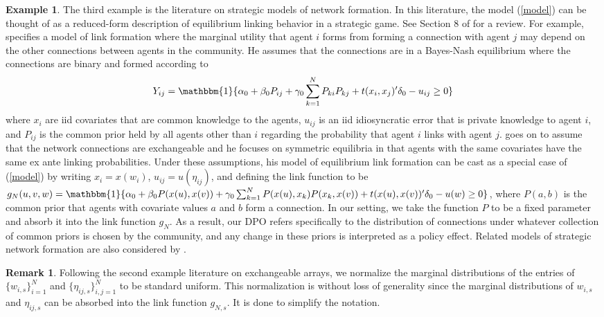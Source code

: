 \documentclass[12pt]{article}
\theoremstyle{definition}
\newtheorem{example}{Example}
\newtheorem{remark}{Remark}
\begin{document}
\begin{example}
The third example is the literature on strategic models of network formation. In this literature, the model (\ref{model}) can be thought of as a reduced-form description of equilibrium linking behavior in a strategic game. See Section 8 of \cite{graham2020network} for a review.  For example, \cite{leung2015two} specifies a model of link formation where the marginal utility that agent $i$ forms from forming a connection with agent $j$ may depend on the other connections between agents in the community. He assumes that the connections are in a Bayes-Nash equilibrium where the connections are binary and formed according to 
\begin{equation*}
Y_{ij} = \mathbbm{1}\{\alpha_0 + \beta_0 P_{ij} + \gamma_0 \sum_{k=1}^{N} P_{ki}P_{kj} + t(x_i,x_j)'\delta_0 - u_{ij} \geq 0\}
\end{equation*}
where $x_i$ are iid covariates that are common knowledge to the agents, $u_{ij}$ is an iid idiosyncratic error that is private knowledge to agent $i$, and $P_{ij}$ is the common prior held by all agents other than $i$ regarding the probability that agent $i$ links with agent $j$. \cite{leung2015two} goes on to assume that the network connections are exchangeable and he focuses on symmetric equilibria in that agents with the same covariates have the same ex ante linking probabilities. Under these assumptions, his model of equilibrium link formation can be cast as a special case of  (\ref{model}) by writing $x_i = x(w_i)$, $u_{ij} = u(\eta_{ij})$, and defining the link function to be $g_{N}(u,v,w) = \mathbbm{1}\{\alpha_0 + \beta_0 P(x(u),x(v)) + \gamma_0 \sum_{k=1}^{N} P(x(u),x_k)P(x_k,x(v)) + t(x(u),x(v))'\delta_0 - u(w) \geq 0\}$, where $P(a,b)$ is the common prior that agents with covariate values $a$ and $b$ form a connection. In our setting, we take the function $P$ to be a fixed parameter and absorb it into the link function $g_N$. As a result, our DPO refers specifically to the distribution of connections under whatever collection of common priors is chosen by the community, and any change in these priors is interpreted as a policy effect. Related models of strategic network formation are also considered by \cite{ridder2015estimation,menzel2015strategic}.   
\end{example}

\begin{remark}
Following the second example literature on exchangeable arrays, we normalize the marginal distributions of the entries of $\{w_{i,s}\}_{i=1}^{N}$ and $\{\eta_{ij,s}\}_{i,j = 1}^{N}$ to be standard uniform. This normalization is without loss of generality since the marginal distributions of $w_{i,s}$ and $\eta_{ij,s}$ can be absorbed into the link function $g_{N,s}$. It is done to simplify the notation.  
\end{remark}
\end{document}
